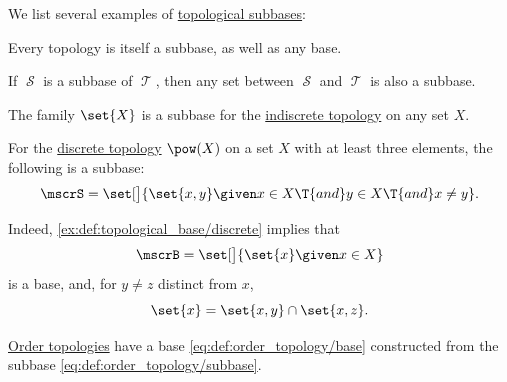 \begin{example}\label{ex:def:topological_subbase}
  We list several examples of \hyperref[def:topological_subbase]{topological subbases}:
  \begin{thmenum}
     Every topology is itself a subbase, as well as any base.

     If \( \mscrS \) is a subbase of \( \mscrT \), then any set between \( \mscrS \) and \( \mscrT \) is also a subbase.

     The family \( \set{ X } \) is a subbase for the \hyperref[def:indiscrete_topology]{indiscrete topology} on any set \( X \).

     For the \hyperref[def:discrete_topology]{discrete topology} \( \pow(X) \) on a set \( X \) with at least three elements, the following is a subbase:
    \begin{equation*}
      \mscrS = \set[\big]{ \set{ x, y } \given x \in X \T{and} y \in X \T{and} x \neq y }.
    \end{equation*}

    Indeed, \cref{ex:def:topological_base/discrete} implies that
    \begin{equation*}
      \mscrB = \set[\big]{ \set{ x } \given x \in X }
    \end{equation*}
    is a base, and, for \( y \neq z \) distinct from \( x \),
    \begin{equation*}
      \set{ x } = \set{ x, y } \cap \set{ x, z }.
    \end{equation*}

     \hyperref[def:order_topology]{Order topologies} have a base \eqref{eq:def:order_topology/base} constructed from the subbase \eqref{eq:def:order_topology/subbase}.
  \end{thmenum}
\end{example}

